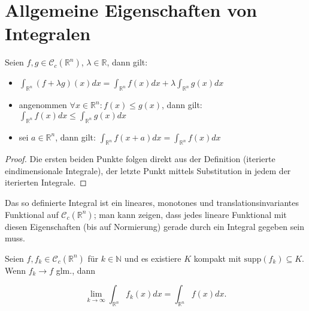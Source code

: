 \section{Allgemeine Eigenschaften von Integralen}
\begin{theorem}
	Seien $f,g\in \mathcal C_c(\mathbb R^n)$, $\lambda\in \mathbb R$, dann gilt:
	
	\begin{itemize}
		\item $\int_{\mathbb R^n}(f+\lambda g)(x)dx=\int_{\mathbb R^n} f(x)dx + \lambda\int_{\mathbb R^n} g(x)dx$
		\item angenommen $\forall x\in\mathbb R^n: f(x)\leq g(x)$, dann gilt: $\int_{\mathbb R^n} f(x)dx \leq \int_{\mathbb R^n} g(x)dx$
		\item sei $a\in\mathbb R^n$, dann gilt: $\int_{\mathbb R^n} f(x+a)dx = \int_{\mathbb R^n} f(x)dx$
	\end{itemize}
\end{theorem}
\begin{proof}
	Die ersten beiden Punkte folgen direkt aus der Definition (iterierte eindimensionale Integrale), der letzte Punkt mittels Substitution in jedem der iterierten Integrale.
\end{proof}
\begin{remark}
	Das so definierte Integral ist ein lineares, monotones und translationsinvariantes Funktional auf $\mathcal C_c(\mathbb R^n)$; man kann zeigen, dass jedes lineare Funktional mit diesen Eigenschaften (bis auf Normierung) gerade durch ein Integral gegeben sein muss.
\end{remark}

\begin{theorem}
	Seien $f,f_k\in\mathcal C_c(\mathbb R^n)$ f\"ur $k\in\mathbb N$ und es existiere $K$ kompakt mit $\text{supp}(f_k)\subseteq K$. Wenn $f_k \rightarrow f$ glm., dann 
	
	$$\lim_{k\rightarrow\infty}\int_{\mathbb R^n}f_k(x)dx = \int_{\mathbb R^n} f(x)dx.$$
\end{theorem}





